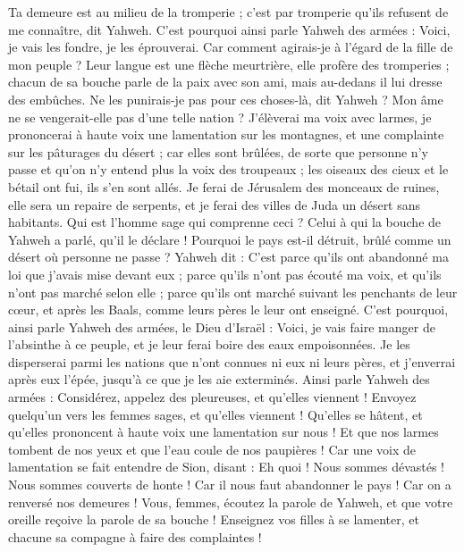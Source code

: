 \begin{multicols}{2}
Ta demeure est au milieu de la tromperie ; c’est par tromperie qu’ils refusent de me connaître, dit Yahweh.
C'est pourquoi ainsi parle Yahweh des armées : Voici, je vais les fondre, je les éprouverai. Car comment agirais-je  à l'égard de la fille de mon peuple ?
Leur langue est une flèche meurtrière, elle profère des tromperies ; chacun de sa bouche parle de la paix avec son ami, mais au-dedans il lui dresse des embûches.
Ne les punirais-je pas pour ces choses-là, dit Yahweh ? Mon âme ne se vengerait-elle pas d'une telle nation ?
J'élèverai ma voix avec larmes, je prononcerai à haute voix une lamentation sur les montagnes, et une complainte sur les pâturages du désert ; car elles sont brûlées, de sorte que personne n’y passe et qu'on n'y entend plus la voix des troupeaux ; les oiseaux des cieux et le bétail ont fui, ils s'en sont allés.
Je ferai de Jérusalem des monceaux de ruines, elle sera un repaire de serpents, et je ferai des villes de Juda un désert sans habitants.
Qui est l'homme sage qui comprenne ceci ? Celui à qui la bouche de Yahweh a parlé, qu’il le déclare ! Pourquoi le pays est-il détruit, brûlé comme un désert où personne ne passe ?
Yahweh dit : C’est parce qu'ils ont abandonné ma loi que j’avais mise devant eux ; parce qu'ils n'ont pas écouté ma voix, et qu’ils n'ont pas marché selon elle ;
parce qu'ils ont marché suivant les penchants de leur cœur, et après les Baals, comme leurs pères le leur ont enseigné.
C'est pourquoi, ainsi parle Yahweh des armées, le Dieu d'Israël : Voici, je vais faire manger de l’absinthe à ce peuple, et je leur ferai boire des eaux empoisonnées.
Je les disperserai parmi les nations que n’ont connues ni eux ni leurs pères, et j'enverrai après eux l'épée, jusqu’à ce que je les aie exterminés.
Ainsi parle Yahweh des armées : Considérez, appelez des pleureuses, et qu'elles viennent ! Envoyez quelqu’un vers les femmes sages, et qu'elles viennent !
Qu'elles se hâtent, et qu'elles prononcent à haute voix une lamentation sur nous ! Et que nos larmes tombent de nos yeux et que l’eau coule de nos paupières !
Car une voix de lamentation se fait entendre de Sion, disant : Eh quoi ! Nous sommes dévastés ! Nous sommes couverts de honte ! Car il nous faut abandonner le pays ! Car on a renversé nos demeures !
Vous, femmes, écoutez la parole de Yahweh, et que votre oreille reçoive la parole de sa bouche ! Enseignez vos filles à se lamenter, et chacune sa compagne à faire des complaintes !

\end{multicols}
